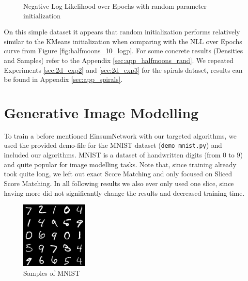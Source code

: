 \begin{figure}[H]
    \centering
    \caption{Negative Log Likelihood over Epochs with random parameter initialization}
    \label{fig:halfmoons_10_random_logp}
\end{figure}

On this simple dataset it appears that random initialization performs relatively similar to the KMeans initialization when comparing with the NLL over Epochs curve from Figure \ref{fig:halfmoons_10_logp}. For some concrete results (Densities and Samples) refer to the Appendix \ref{sec:app_halfmoons_rand}.
We repeated Experiments \ref{sec:2d_exp2} and \ref{sec:2d_exp3} for the spirals dataset, results can be found in Appendix \ref{sec:app_spirals}.

\section{Generative Image Modelling}
\label{sec:exp_image}

To train a before mentioned EinsumNetwork \cite{einsum} with our targeted algorithms, we used the provided demo-file for the MNIST \cite{mnist} dataset (\texttt{demo\_mnist.py}) and included 
our algorithms. MNIST is a dataset of handwritten digits (from 0 to 9) and quite popular for image modelling tasks.
Note that, since training already took quite long, we left out exact Score Matching and only focused on Sliced Score Matching. 
In all following results we also ever only used one slice, since having more did not significantly 
change the results and decreased training time. \\

\begin{figure}[H]
    \centering
    \includegraphics[width=0.3\textwidth]{figures/einsum/mnist/[]_ground_truth.png}
    \caption{Samples of MNIST}
\end{figure}

